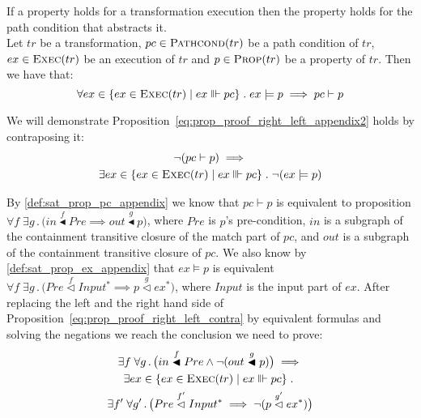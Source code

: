 % 
\begin{lemma}{If a property holds for a transformation execution then the property holds for the path condition that abstracts it.\\}
\label{lemma:validity2_appendix}
Let $tr$ be a transformation, $pc\in \textsc{Pathcond}(tr)$ be a path condition of $tr$, $ex\in \textsc{Exec}(tr)$ be an execution of $tr$ and $p\in \textsc{Prop}(tr)$ be a property of $tr$. Then we have that:
\begin{equation}
\label{eq:prop_proof_right_left_appendix2}
\forall ex\in\{ex\in\textsc{Exec}(tr)\;|\;ex\Vvdash pc\}\;.\; ex\models p\;\Longrightarrow \; pc\vdash p
\end{equation}
\end{lemma}
\begin{pf}
We will demonstrate Proposition~\ref{eq:prop_proof_right_left_appendix2} holds by contraposing it:
\begin{multline}
\label{eq:prop_proof_right_left_contra}
\neg(pc\vdash p) \;\Longrightarrow \;\\\exists ex\in\{ex\in\textsc{Exec}(tr)\;|\;ex\Vvdash pc\}\;.\; \neg(ex\models p)
\end{multline}

By \cref{def:sat_prop_pc_appendix} we know that $pc\vdash p$ is equivalent to proposition $\forall f\; \exists g\,.\,\big(in\stackrel{f}{\blacktriangleleft} Pre \implies out \stackrel{g}\blacktriangleleft p\big)$, where $Pre$ is $p$'s pre-condition, $in$ is a subgraph of the containment transitive closure of the match part of $pc$, and $out$ is a subgraph of the containment transitive closure of $pc$. We also know by \cref{def:sat_prop_ex_appendix} that $ex\models p$ is equivalent $\forall f\; \exists g\,.\,\big(Pre \stackrel{f}{\vartriangleleft} Input^{*} \implies p \stackrel{g}{\vartriangleleft} ex^*\big)$, where $Input$ is the input part of $ex$. After replacing the left and the right hand side of Proposition~\ref{eq:prop_proof_right_left_contra} by equivalent formulas and solving the negations we reach the conclusion we need to prove:
\begin{multline}
\label{eq:prop_proof_right_left_contra_neg}
\exists f\; \forall g\,.\,\big(in\stackrel{f}{\blacktriangleleft} Pre \land \neg(out \stackrel{g}\blacktriangleleft p)\big) \;\Longrightarrow \;\\\exists ex\in\{ex\in\textsc{Exec}(tr)\;|\;ex\Vvdash pc\}\;.\;\\ \exists f'\; \forall g'\,.\,\big(Pre \stackrel{f'}{\vartriangleleft} Input^{*} \implies \neg(p \stackrel{g'}{\vartriangleleft} ex^*)\big)
\end{multline}


\end{pf}
